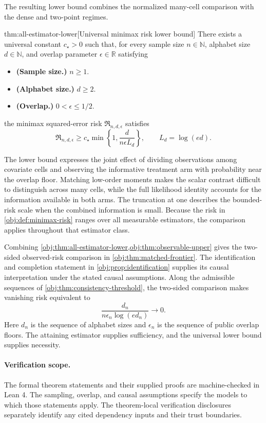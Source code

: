 The resulting lower bound combines the normalized many-cell comparison with the dense and two-point regimes.

\begin{theoremv}{thm:all-estimator-lower}[Universal minimax risk lower bound]
There exists a universal constant \(c_\star>0\) such that, for every sample size \(n\in\mathbb N\), alphabet size \(d\in\mathbb N\), and overlap parameter \(\epsilon\in\mathbb R\) satisfying
\begin{itemize}
\item \textbf{(Sample size.)} \(n\ge1\).
\item \textbf{(Alphabet size.)} \(d\ge2\).
\item \textbf{(Overlap.)} \(0<\epsilon\le1/2\).
\end{itemize}
the minimax squared-error risk \(\mathfrak R_{n,d,\epsilon}\) satisfies
\[
\mathfrak R_{n,d,\epsilon}
\ge c_\star\min\left\{1,\frac{d}{n\epsilon L_d}\right\},
\qquad L_d=\log(ed).
\]
\end{theoremv}

The lower bound expresses the joint effect of dividing observations among covariate cells and observing the informative treatment arm with probability near the overlap floor. Matching low-order moments makes the scalar contrast difficult to distinguish across many cells, while the full likelihood identity accounts for the information available in both arms. The truncation at one describes the bounded-risk scale when the combined information is small. Because the risk in \cref{obj:def:minimax-risk} ranges over all measurable estimators, the comparison applies throughout that estimator class.

Combining \cref{obj:thm:all-estimator-lower,obj:thm:observable-upper} gives the two-sided observed-risk comparison in \cref{obj:thm:matched-frontier}. The identification and completion statement in \cref{obj:prop:identification} supplies its causal interpretation under the stated causal assumptions. Along the admissible sequences of \cref{obj:thm:consistency-threshold}, the two-sided comparison makes vanishing risk equivalent to
\[
\frac{d_n}{n\epsilon_n\log(ed_n)}\longrightarrow0.
\]
Here \(d_n\) is the sequence of alphabet sizes and \(\epsilon_n\) is the sequence of public overlap floors. The attaining estimator supplies sufficiency, and the universal lower bound supplies necessity.

\paragraph{Verification scope.}
The formal theorem statements and their supplied proofs are machine-checked in Lean 4. The sampling, overlap, and causal assumptions specify the models to which those statements apply. The theorem-local verification disclosures separately identify any cited dependency inputs and their trust boundaries.
